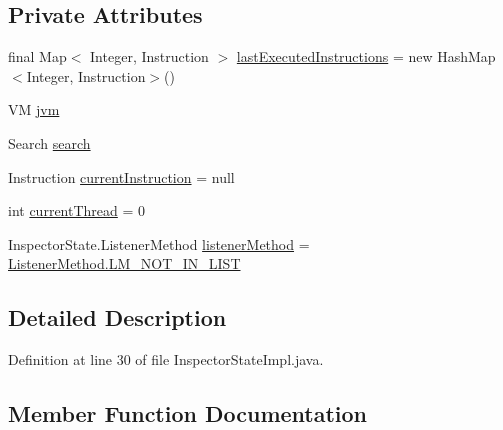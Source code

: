 \subsection*{Private Attributes}
\begin{DoxyCompactItemize}
\item 
final Map$<$ Integer, Instruction $>$ \hyperlink{classgov_1_1nasa_1_1jpf_1_1inspector_1_1server_1_1expression_1_1_inspector_state_impl_a51d0e82854748641ec231294a250d4eb}{last\+Executed\+Instructions} = new Hash\+Map$<$Integer, Instruction$>$()
\item 
VM \hyperlink{classgov_1_1nasa_1_1jpf_1_1inspector_1_1server_1_1expression_1_1_inspector_state_impl_a0c9ed60abbbcc0a956d2902347770dda}{jvm}
\item 
Search \hyperlink{classgov_1_1nasa_1_1jpf_1_1inspector_1_1server_1_1expression_1_1_inspector_state_impl_aad68b55c445091d252a965081641b48f}{search}
\item 
Instruction \hyperlink{classgov_1_1nasa_1_1jpf_1_1inspector_1_1server_1_1expression_1_1_inspector_state_impl_a7399cb79ee39368da7fb3440e586d52f}{current\+Instruction} = null
\item 
int \hyperlink{classgov_1_1nasa_1_1jpf_1_1inspector_1_1server_1_1expression_1_1_inspector_state_impl_a625feb5ca6498aa4ca9393ad502ea325}{current\+Thread} = 0
\item 
Inspector\+State.\+Listener\+Method \hyperlink{classgov_1_1nasa_1_1jpf_1_1inspector_1_1server_1_1expression_1_1_inspector_state_impl_a6cc5f61624118469f3c43361c867f439}{listener\+Method} = \hyperlink{enumgov_1_1nasa_1_1jpf_1_1inspector_1_1server_1_1expression_1_1_inspector_state_1_1_listener_method_a49e44c44d3bb5c7af4f3b2acd441d0c9}{Listener\+Method.\+L\+M\+\_\+\+N\+O\+T\+\_\+\+I\+N\+\_\+\+L\+I\+ST}
\end{DoxyCompactItemize}


\subsection{Detailed Description}


Definition at line 30 of file Inspector\+State\+Impl.\+java.



\subsection{Member Function Documentation}
